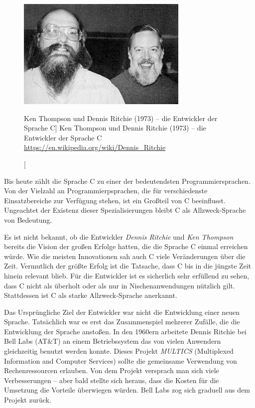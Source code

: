 \begin{appendices}
\begin{figure}
	\includegraphics[width=\linewidth]{./gfx/KTDR}
	\caption%
		[Ken Thompson und Dennis Ritchie (1973) -- die Entwickler der Sprache C]
		{Ken Thompson und Dennis Ritchie (1973) -- die Entwickler der Sprache C\newline
		\url{https://en.wikipedia.org/wiki/Dennis_Ritchie}}
	\vspace{-20pt}
\end{figure}
Bis heute zählt die Sprache C zu einer der bedeutendsten Programmiersprachen. Von der Vielzahl an  Programmierpsprachen, die für verschiedenste Einsatzbereiche zur Verfügung stehen, ist ein Großteil von C beeinflusst. Ungeachtet der Existenz dieser Spezialisierungen bleibt C als Allzweck-Sprache von Bedeutung.

Es ist nicht bekannt, ob die Entwickler \emph{Dennis Ritchie} und \emph{Ken Thompson} bereits die Vision der großen Erfolge hatten, die die Sprache C einmal erreichen würde. Wie die meisten Innovationen sah auch C viele Veränderungen über die Zeit. Vermutlich der größte Erfolg ist die Tatsache, dass C bis in die jüngste Zeit hinein relevant blieb. Für die Entwickler ist es sicherlich sehr erfüllend zu sehen, dass C nicht als überholt oder als nur in Nischenanwendungen nützlich gilt. Stattdessen ist C als starke Allzweck-Sprache anerkannt.

Das Ursprüngliche Ziel der Entwickler war nicht die Entwicklung einer neuen Sprache. Tatsächlich war es erst das Zusammenspiel mehrerer Zufälle, die die Entwicklung der Sprache anstoßen. In den 1960ern arbeitete Dennis Ritchie bei Bell Labs (AT\&T) an einem Betriebssystem das von vielen Anwendern gleichzeitig benutzt werden konnte. Dieses Projekt \emph{MULTICS} (Multiplexed Information and Computer Services) sollte die gemeinsame Verwendung von Rechenressourcen erlauben. Von dem Projekt versprach man sich viele Verbesserungen -- aber bald stellte sich heraus, dass die Kosten für die Umsetzung die Vorteile überwiegen würden. Bell Labs zog sich graduell aus dem Projekt zurück.


\end{appendices}
